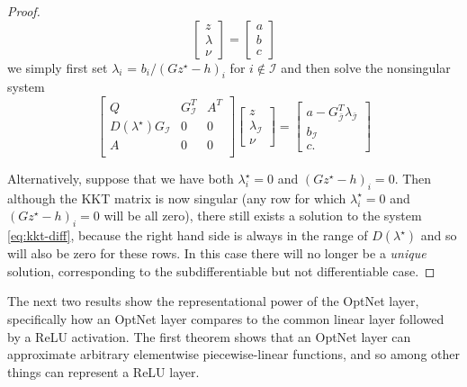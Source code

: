 \begin{proof}
\begin{equation}
\begin{bmatrix}
      z \\ \lambda \\ \nu
    \end{bmatrix} =
    \begin{bmatrix}
      a \\ b \\ c
    \end{bmatrix}
  \end{equation}
  we simply first set $\lambda_i$ = $b_i / (Gz^\star - h)_i$ for
  $i \not \in \mathcal{I}$ and then solve the nonsingular system
    \begin{equation}
    \begin{bmatrix}
      Q & G_{\mathcal{I}}^T & A^T \\
      D(\lambda^\star)G_{\mathcal{I}}  & 0 & 0 \\
      A & 0 & 0 \\
    \end{bmatrix}
    \begin{bmatrix}
      z \\ \lambda_\mathcal{I} \\ \nu
    \end{bmatrix} =
    \begin{bmatrix}
      a - G^T_{\bar{\mathcal{I}}} \lambda_{\bar{\mathcal{I}}} \\ b_\mathcal{I} \\ c.
    \end{bmatrix}
  \end{equation}

  Alternatively, suppose that we have both $\lambda^\star_i = 0$ and $(Gz^\star
  - h)_i = 0$.  Then although the KKT matrix is now singular (any row for which
  $\lambda^\star_i = 0$ and $(Gz^\star -  h)_i = 0$ will be all zero), there
  still exists a solution to the system \eqref{eq:kkt-diff}, because the right
  hand side is always in the range of $D(\lambda^\star)$ and so will also be
  zero for these rows.  In this case there will no longer be a \emph{unique}
  solution, corresponding to the subdifferentiable but not differentiable case.
\end{proof}


The next two results show the representational power of the OptNet layer,
specifically how an OptNet layer compares to the common linear layer followed by
a ReLU activation.  The first theorem shows that an OptNet layer can
approximate arbitrary elementwise piecewise-linear functions, and so among other
things can represent a ReLU layer.

